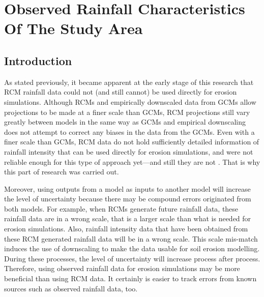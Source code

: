 \section{Observed Rainfall Characteristics Of The Study Area}
\label{sec:RainfallCharacteristicsOfTheStudyArea}


\subsection{Introduction}
\label{sec:ObservedRainfallIntroduction}
As stated previously, it became apparent at the early stage of this research
that RCM rainfall data could not (and still cannot) be used directly for erosion
simulations. Although RCMs and empirically downscaled data from GCMs allow
projections to be made at a finer scale than GCMs, RCM projections still vary
greatly between models in the same way as GCMs and empirical downscaling does
not attempt to correct any biases in the data from the GCMs. Even with a finer
scale than GCMs, RCM data do not hold sufficiently detailed information of
rainfall intensity that can be used directly for erosion simulations, and were
not reliable enough for this type of approach yet---and still they are not
\citep{nearing2001-229,michael2005-155,o'neal2005-165}. That is why this part of
research was carried out.

Moreover, using outputs from a model as inputs to another model will increase
the level of uncertainty because there may be compound errors originated from
both models. For example, when RCMs generate future rainfall data, these
rainfall data are in a wrong scale, that is a larger scale than what is needed
for erosion simulations. Also, rainfall intensity data that have been obtained
from these RCM generated rainfall data will be in a wrong scale. This scale
mis-match induces the use of downscaling to make the data usable for soil
erosion modelling. During these processes, the level of uncertainty will
increase process after process. Therefore, using observed rainfall data for
erosion simulations may be more beneficial than using RCM data. It certainly is
easier to track errors from known sources such as observed rainfall data, too.

